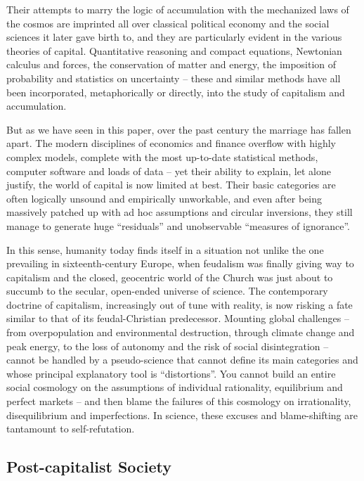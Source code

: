 \documentclass[
]{book}
\begin{document}
Their attempts to marry the logic of accumulation with the mechanized laws of the cosmos are imprinted all over classical political economy and the social sciences it later gave birth to, and they are particularly evident in the various theories of capital. Quantitative reasoning and compact equations, Newtonian calculus and forces, the conservation of matter and energy, the imposition of probability and statistics on uncertainty -- these and similar methods have all been incorporated, metaphorically or directly, into the study of capitalism and accumulation.

But as we have seen in this paper, over the past century the marriage has fallen apart. The modern disciplines of economics and finance overflow with highly complex models, complete with the most up-to-date statistical methods, computer software and loads of data -- yet their ability to explain, let alone justify, the world of capital is now limited at best. Their basic categories are often logically unsound and empirically unworkable, and even after being massively patched up with ad hoc assumptions and circular inversions, they still manage to generate huge ``residuals'' and unobservable ``measures of ignorance''.

In this sense, humanity today finds itself in a situation not unlike the one prevailing in sixteenth-century Europe, when feudalism was finally giving way to capitalism and the closed, geocentric world of the Church was just about to succumb to the secular, open-ended universe of science. The contemporary doctrine of capitalism, increasingly out of tune with reality, is now risking a fate similar to that of its feudal-Christian predecessor. Mounting global challenges -- from overpopulation and environmental destruction, through climate change and peak energy, to the loss of autonomy and the risk of social disintegration -- cannot be handled by a pseudo-science that cannot define its main categories and whose principal explanatory tool is ``distortions''. You cannot build an entire social cosmology on the assumptions of individual rationality, equilibrium and perfect markets -- and then blame the failures of this cosmology on irrationality, disequilibrium and imperfections. In science, these excuses and blame-shifting are tantamount to self-refutation.

\hypertarget{post-capitalist-society}{%
\subsection{Post-capitalist Society}\label{post-capitalist-society}}
\end{document}
